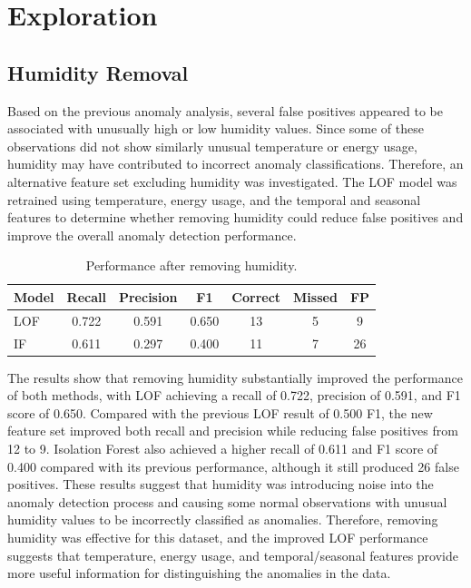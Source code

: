 \documentclass[a4paper,12pt]{article}
\begin{document}
\section{Exploration}

\subsection{Humidity Removal}

Based on the previous anomaly analysis, several false positives appeared to be associated with unusually high or low humidity values. Since some of these observations did not show similarly unusual temperature or energy usage, humidity may have contributed to incorrect anomaly classifications. Therefore, an alternative feature set excluding humidity was investigated. The LOF model was retrained using temperature, energy usage, and the temporal and seasonal features to determine whether removing humidity could reduce false positives and improve the overall anomaly detection performance.

\begin{table}
	\centering
	\small
	\setlength{\tabcolsep}{5pt}
	\caption{Performance after removing humidity.}
	\label{tab:humidity_removal}
	\begin{tabular}{lcccccc}
		\hline
		Model & Recall & Precision & F1 & Correct & Missed & FP \\
		\hline
		LOF & 0.722 & 0.591 & 0.650 & 13 & 5 & 9 \\
		IF & 0.611 & 0.297 & 0.400 & 11 & 7 & 26 \\
		\hline
	\end{tabular}
\end{table}

The results show that removing humidity substantially improved the performance of both methods, with LOF achieving a recall of 0.722, precision of 0.591, and F1 score of 0.650. Compared with the previous LOF result of 0.500 F1, the new feature set improved both recall and precision while reducing false positives from 12 to 9. Isolation Forest also achieved a higher recall of 0.611 and F1 score of 0.400 compared with its previous performance, although it still produced 26 false positives. These results suggest that humidity was introducing noise into the anomaly detection process and causing some normal observations with unusual humidity values to be incorrectly classified as anomalies. Therefore, removing humidity was effective for this dataset, and the improved LOF performance suggests that temperature, energy usage, and temporal/seasonal features provide more useful information for distinguishing the anomalies in the data.
\end{document}
